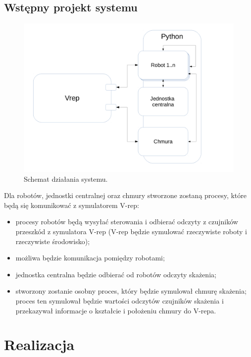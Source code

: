 \documentclass[a4paper, 12pt]{article}
\begin{document}
	
	
		
	

	
	\clearpage
	\subsection{Wstępny projekt systemu}	
	\begin{figure}[h!]
		\centering
		\includegraphics[width=0.9\columnwidth]{img/schemat_sst_1.pdf}
		\caption{Schemat działania systemu.}
	\end{figure}
	Dla robotów, jednostki centralnej oraz chmury stworzone zostaną procesy, które będą się komunikować z symulatorem V-rep:
	\begin{itemize}
		\item procesy robotów będą wysyłać sterowania i odbierać odczyty z czujników przeszkód z symulatora V-rep (V-rep będzie symulować rzeczywiste roboty i rzeczywiste środowisko);
		\item możliwa będzie komunikacja pomiędzy robotami;
		\item jednostka centralna będzie odbierać od robotów odczyty skażenia;
		\item stworzony zostanie osobny proces, który będzie symulował chmurę skażenia; proces ten symulował będzie wartości odczytów czujników skażenia i przekazywał informacje o kształcie i położeniu chmury do V-repa.
	\end{itemize}
	
	\section{Realizacja}
\end{document}

